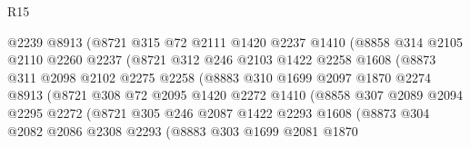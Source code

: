 \begin{lexlean}{R15}
\begin{coremodule}
                        @2239
                        @8913
                        (@8721
                          @315
                          @72
                          @2111
                          @1420
                          @2237
                          @1410
                          (@8858
                            @314
                            @2105
                            @2110
                            @2260
                            @2237
                            (@8721
                              @312
                              @246
                              @2103
                              @1422
                              @2258
                              @1608
                              (@8873
                                @311
                                @2098
                                @2102
                                @2275
                                @2258
                                (@8883
                                  @310
                                  @1699
                                  @2097
                                  @1870
                                  @2274
                                  @8913
                                  (@8721
                                    @308
                                    @72
                                    @2095
                                    @1420
                                    @2272
                                    @1410
                                    (@8858
                                      @307
                                      @2089
                                      @2094
                                      @2295
                                      @2272
                                      (@8721
                                        @305
                                        @246
                                        @2087
                                        @1422
                                        @2293
                                        @1608
                                        (@8873
                                          @304
                                          @2082
                                          @2086
                                          @2308
                                          @2293
                                          (@8883
                                            @303
                                            @1699
                                            @2081
                                            @1870

\end{coremodule}
\end{lexlean}
